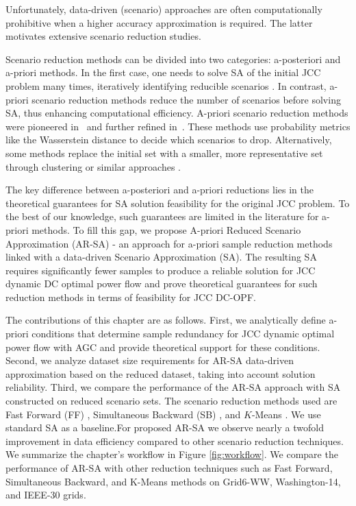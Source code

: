 Unfortunately, data-driven (scenario) approaches are often computationally prohibitive when a higher accuracy approximation is required. The latter motivates extensive scenario reduction studies.

Scenario reduction methods can be divided into two categories: a-posteriori and a-priori methods. In the first case, one needs to solve SA of the initial JCC problem many times, iteratively identifying reducible scenarios \cite{campi2011sampling, geng2019data}. In contrast, a-priori scenario reduction methods reduce the number of scenarios before solving SA, thus enhancing computational efficiency. A-priori scenario reduction methods were pioneered in~\cite{dupavcova2003scenario, dupavcova1990stability} and further refined in~\cite{heitsch2003scenario}. These methods use probability metrics like the Wasserstein distance to decide which scenarios to drop. Alternatively, some methods replace the initial set with a smaller, more representative set through clustering or similar approaches \cite{rujeerapaiboon2022scenario, keutchayan2023problem, liang2020scenario}.


The key difference between a-posteriori and a-priori reductions lies in the theoretical guarantees for SA solution feasibility for the original JCC problem. To the best of our knowledge, such guarantees are limited in the literature for a-priori methods. To fill this gap, we propose A-priori Reduced Scenario Approximation (AR-SA) - an approach for a-priori sample reduction methods linked with a data-driven Scenario Approximation (SA). The resulting SA requires significantly fewer samples to produce a reliable solution for JCC dynamic DC optimal power flow  and prove theoretical guarantees for such reduction methods in terms of feasibility for JCC DC-OPF.

The contributions of this chapter are as follows. First, we analytically define a-priori conditions that determine sample redundancy for JCC dynamic optimal power flow with AGC and provide theoretical support for these conditions. Second, we analyze dataset size requirements for AR-SA data-driven approximation based on the reduced dataset, taking into account solution reliability. Third, we compare the performance of the AR-SA approach with SA constructed on reduced scenario sets. The scenario reduction methods used are Fast Forward (FF) \cite{dupavcova2003scenario}, Simultaneous Backward (SB) \cite{heitsch2003scenario}, and $K$-Means \cite{keutchayan2023problem}. We use standard SA as a baseline.For proposed AR-SA we observe nearly a twofold improvement in data efficiency compared to other scenario reduction techniques. We summarize the chapter's workflow in Figure \ref{fig:workflow}. We compare the performance of AR-SA with other reduction techniques such as Fast Forward, Simultaneous Backward, and K-Means methods on Grid6-WW, Washington-14, and IEEE-30 grids.

